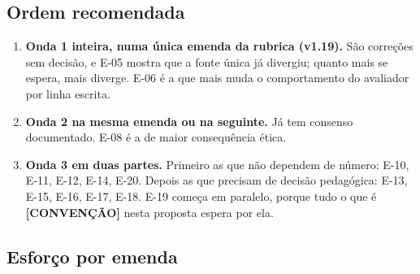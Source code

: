 \documentclass[11pt,a4paper]{article}
\newcommand{\conv}{\textbf{[CONVENÇÃO]}}
\begin{document}
\subsection{Ordem recomendada}

\begin{enumerate}
  \item \textbf{Onda 1 inteira, numa única emenda da rubrica (v1.19).} São correções sem decisão,
        e E-05 mostra que a fonte única já divergiu; quanto mais se espera, mais diverge. E-06 é a
        que mais muda o comportamento do avaliador por linha escrita.
  \item \textbf{Onda 2 na mesma emenda ou na seguinte.} Já tem consenso documentado. E-08 é a de
        maior consequência ética.
  \item \textbf{Onda 3 em duas partes.} Primeiro as que não dependem de número: E-10, E-11, E-12,
        E-14, E-20. Depois as que precisam de decisão pedagógica: E-13, E-15, E-16, E-17, E-18. E-19
        começa em paralelo, porque tudo o que é \conv{} nesta proposta espera por ela.
\end{enumerate}

\subsection{Esforço por emenda}
\end{document}
